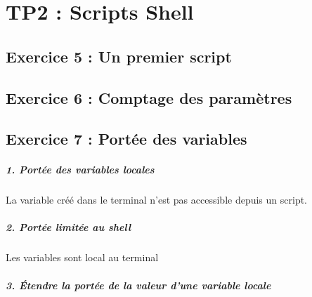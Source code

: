 \chapter{TP2 : Scripts Shell}
    \section{Exercice 5 : Un premier script}
        
    \section{Exercice 6 : Comptage des paramètres}
        
        
    \section{Exercice 7 : Portée des variables}
        \paragraph{1. Portée des variables locales}
            La variable créé dans le terminal n'est pas accessible depuis un script.
        \paragraph{2. Portée limitée au shell}
            Les variables sont local au terminal
        \paragraph{3. Étendre la portée de la valeur d’une variable locale}
